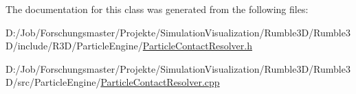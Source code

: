 The documentation for this class was generated from the following files\+:\begin{DoxyCompactItemize}
\item 
D\+:/\+Job/\+Forschungsmaster/\+Projekte/\+Simulation\+Visualization/\+Rumble3\+D/\+Rumble3\+D/include/\+R3\+D/\+Particle\+Engine/\mbox{\hyperlink{_particle_contact_resolver_8h}{Particle\+Contact\+Resolver.\+h}}\item 
D\+:/\+Job/\+Forschungsmaster/\+Projekte/\+Simulation\+Visualization/\+Rumble3\+D/\+Rumble3\+D/src/\+Particle\+Engine/\mbox{\hyperlink{_particle_contact_resolver_8cpp}{Particle\+Contact\+Resolver.\+cpp}}\end{DoxyCompactItemize}
